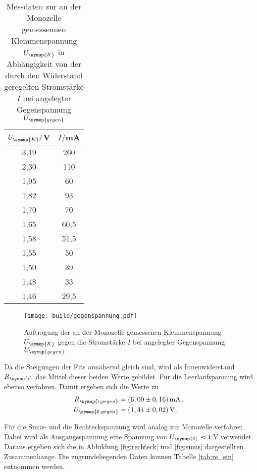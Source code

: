 \begin{table}
  \centering
  \caption{Messdaten zur an der Monozelle gemessennen Klemmenspannung $U_{\symup{K}}$
  in Abhängigkeit von der durch den Widerstand geregelten Stromstärke $I$ bei angelegter
  Gegenspannung $U_{\symup{gegen}}$}
  \label{tab:gegenspannung}
  \begin{tabular}{c c}
    \toprule
    $U_{\symup{K}}/$V & $I/$mA\\
    \midrule
    3,19	&  260\\
    2,30	&  110\\
    1,95	&  60\\
    1,82	&  93\\
    1,70	&  70\\
    1,65	&  60,5\\
    1,58	&  51,5\\
    1,55	&  50\\
    1,50	&  39\\
    1,48	&  33\\
    1,46	&  29,5\\
    \bottomrule
  \end{tabular}
\end{table}

\begin{figure}
  \centering
  \texttt{[image: build/gegenspannung.pdf]}
  \caption{Auftragung der an der Monozelle gemessenen Klemmenspannung $U_{\symup{K}}$
  gegen die Stromstärke $I$ bei angelegter Gegenspannung $U_{\symup{gegen}}$ }
  \label{fig:gegenspannung}
\end{figure}

Da die Steigungen der Fits annähernd gleich sind, wird als Innenwiderstand $R_{\symup{i}}$
das Mittel dieser beiden Werte gebildet. Für die Leerlaufspannung wird ebenso verfahren.
Damit ergeben sich die Werte zu
\begin{align}
  R_{\symup{i,gegen}}&=(6,00\pm0,16)\,\text{mA} \,,\\
  U_{\symup{0,gegen}}&=(1,44\pm0,02)\,\text{V} \,.
\end{align}

Für die Sinus- und die Rechteckspannung wird analog zur Monozelle verfahren. Dabei
wird als Ausgangsspannung eine Spannung von $U_{\symup{0}}\approx1$\,V verwendet.
Daraus ergeben sich die in Abbildung \ref{fig:rechteck} und \ref{fig:sinus} dargestellten
Zusammenhänge. Die zugrundeliegenden Daten können Tabelle \ref{tab:re_sin} entnommen
werden.

